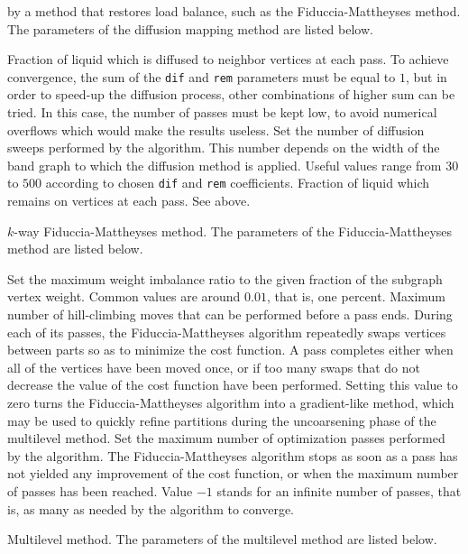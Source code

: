 \begin{itemize}
by a method that restores load balance, such as the
Fiduccia-Mattheyses method.
The parameters of the diffusion mapping method are listed below.
\begin{itemize}
\iteme[{\tt dif=}{\it rat}]
Fraction of liquid which is diffused to neighbor vertices at each
pass. To achieve convergence, the sum of the {\tt dif} and {\tt rem}
parameters must be equal to $1$, but in order to speed-up the diffusion
process, other combinations of higher sum can be tried. In this case,
the number of passes must be kept low, to avoid numerical overflows
which would make the results useless.
\iteme[{\tt pass=}{\it nbr}]
Set the number of diffusion sweeps performed by the algorithm. This
number depends on the width of the band graph to which the diffusion
method is applied. Useful values range from $30$ to $500$ according
to chosen {\tt dif} and {\tt rem} coefficients.
\iteme[{\tt rem=}{\it rat}]
Fraction of liquid which remains on vertices at each pass. See above.
\end{itemize}
\iteme[{\tt f}]
$k$-way Fiduccia-Mattheyses method. The parameters of the
Fiduccia-Mattheyses method are listed below.
\begin{itemize}
\iteme[{\tt bal=}{\it rat}]
Set the maximum weight imbalance ratio to the given fraction of
the subgraph vertex weight. Common values are around $0.01$, that
is, one percent.
\iteme[{\tt move=}{\it nbr}]
Maximum number of hill-climbing moves that can be performed before a
pass ends. During each of its passes, the Fiduccia-Mattheyses
algorithm repeatedly swaps vertices between parts so as to
minimize the cost function. A pass completes either when all of the
vertices have been moved once, or if too many swaps that do not
decrease the value of the cost function have been performed. Setting
this value to zero turns the Fiduccia-Mattheyses algorithm into a
gradient-like method, which may be used to quickly refine partitions
during the uncoarsening phase of the multilevel method.
\iteme[{\tt pass=}{\it nbr}]
Set the maximum number of optimization passes performed by the
algorithm. The Fiduccia-Mattheyses algorithm stops as soon as a pass
has not yielded any improvement of the cost function, or when the
maximum number of passes has been reached. Value $-1$ stands for an
infinite number of passes, that is, as many as needed by the algorithm
to converge.
\end{itemize}
\iteme[{\tt m}]
Multilevel method. The parameters of the multilevel method are listed below.
\begin{itemize}
\iteme[{\tt asc=}{\it strat}]

\end{itemize}
\end{itemize}
